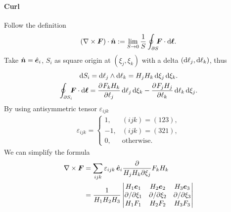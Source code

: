 \documentclass{article}
\newcommand{\ko}[1]{\hspace{-#1 pt}}
\begin{document}
\paragraph{Curl} Follow the definition
$$(\curl\bm F)\cdot\uvec n:=\lim_{S\to0}\frac1S\oint_{\partial S}\ko5\bm F\cdot\d\bm\ell.$$
Take $\mathop{}\!\hat{\bm{n}}=\mathop{}\!\hat{\bm{e}}_i$, $S_i$ as square origin at $(\xi_j,\xi_k)$ with a delta $(\mathop{}\!\mathrm{d}\ell_j,\mathop{}\!\mathrm{d}\ell_k)$, thus
\begin{gather*}
	\d S_i=\d\ell_j\wedge\d\ell_k=H_jH_k\d\xi_j\d\xi_k.\\
	\oint_{\partial S_i}\ko5\bm F\cdot\d\bm\ell=\pv{F_kH_k}{\ell_j}\d\ell_j\d\xi_k-\pv{F_jH_j}{\ell_k}\d\ell_k\d\xi_j.
\end{gather*}
By using antisymmetric tensor $\varepsilon_{ijk}$
\begin{align*}
	\varepsilon_{ijk}=\begin{cases}
		1,  & (ijk)=(123), \\
		-1, & (ijk)=(321), \\
		0,  & \text{otherwise}.
	\end{cases}
\end{align*}
We can simplify the formula
\begin{align*}
	\nabla\times\bm F & =\sum_{ijk}\varepsilon_{ijk}\mathop{}\!\hat{\bm{e}}_i\frac{\partial}{H_jH_k\partial\xi_j}F_kH_k \\
	                  & =\frac1{H_1H_2H_3}\begin{vmatrix}
		H_1\bm e_1             & H_2\bm e_2             & H_3\bm e_3             \\
		\partial/\partial\xi_1 & \partial/\partial\xi_2 & \partial/\partial\xi_3 \\
		H_1F_1                 & H_2F_2                 & H_3F_3
	\end{vmatrix}
\end{align*}
\end{document}
